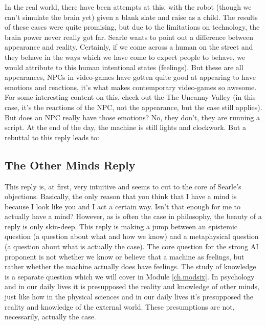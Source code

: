     In the real world, there have been attempts at this, with the robot (though we can't simulate the brain yet) given a blank slate and raise as a child. The results of these cases were quite promising, but due to the limitations on technology, the brain power never really got far. Searle wants to point out a difference between appearance and reality. Certainly, if we come across a human on the street and they behave in the ways which we have come to expect people to behave, we would attribute to this human intentional states (feelings). But these are all appearances, NPCs in video-games have gotten quite good at appearing to have emotions and reactions, it's what makes contemporary video-games so awesome. For some interesting content on this, check out the The Uncanny Valley\autocite{extrahistory2012} (in this case, it's the reactions of the NPC, not the appearance, but the case still applies). But does an NPC really have those emotions? No, they don't, they are running a script. At the end of the day, the machine is still lights and clockwork. But a rebuttal to this reply leads to:
\subsection{The Other Minds Reply}

    This reply is, at first, very intuitive and seems to cut to the core of Searle's objections. Basically, the only reason that you think that I have a mind is because I look like you and I act a certain way. Isn't that enough for me to actually have a mind?  However, as is often the case in philosophy, the beauty of a reply is only skin-deep. This reply is making a jump between an epistemic question (a question about what and how we know) and a metaphysical question (a question about what is actually the case). The core question for the strong AI proponent is not whether we know or believe that a machine as feelings, but rather whether the machine actually does have feelings. The study of knowledge is a separate question which we will cover in Module \ref{ch.modsix}. In psychology and in our daily lives it is presupposed the reality and knowledge of other minds, just like how in the physical sciences and in our daily lives it's presupposed the reality and knowledge of the external world. These presumptions are not, necessarily, actually the case.
